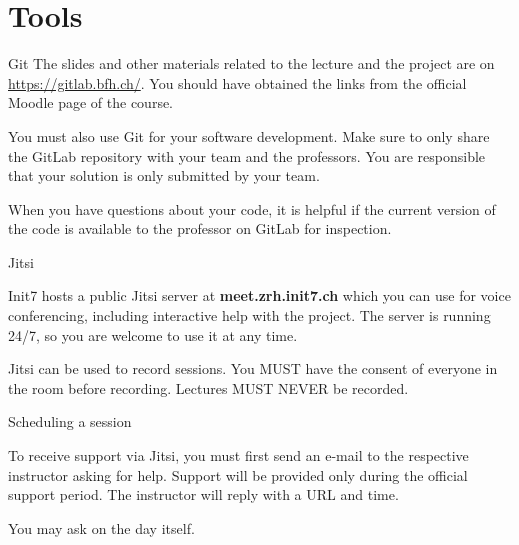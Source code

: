 \documentclass{beamer}
\begin{document}
\section{Tools}

\begin{frame}{Git}
The slides and other materials related to the lecture and the project
are on \url{https://gitlab.bfh.ch/}. You should have obtained the links from
the official Moodle page of the course.

You must also use Git for your software development. Make sure to only
share the GitLab repository with your team and the professors. You are
responsible that your solution is only submitted by your team.

When you have questions about your code, it is helpful if the current
version of the code is available to the professor on GitLab for
inspection.
\end{frame}


\begin{frame}{Jitsi}

Init7 hosts a public Jitsi server at {\bf meet.zrh.init7.ch} which you
can use for voice conferencing, including interactive help with the
project. The server is running 24/7, so you are welcome to use it at
any time.

Jitsi can be used to record sessions. You MUST have the consent
of everyone in the room before recording. Lectures MUST NEVER be
recorded.
\end{frame}

\begin{frame}{Scheduling a session}

To receive support via Jitsi, you must first send an e-mail to the
respective instructor asking for help.  Support will be provided only
during the official support period.  The instructor will reply with a
URL and time.
\vfill

You may ask on the day itself.
\vfill

\end{frame}
\end{document}
